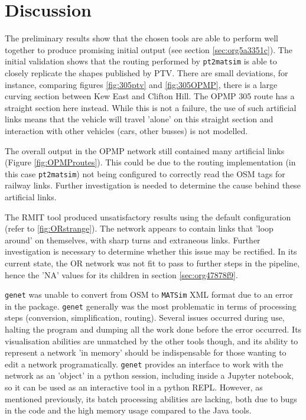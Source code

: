 \documentclass[11pt]{article}
\begin{document}
\section{Discussion}
\label{sec:org4e742d8}
The preliminary results show that the chosen tools are able to perform well together to produce promising initial output (see section \ref{sec:org5a3351c}).  The initial validation shows that the routing performed by \texttt{pt2matsim} is able to closely replicate the shapes published by PTV. There are small deviations, for instance, comparing figures \ref{fig:305ptv} and \ref{fig:305OPMP}, there is a large curving section between Kew East and Clifton Hill. The OPMP 305 route has a straight section here instead. While this is not a failure, the use of such artificial links means that the vehicle will travel 'alone' on this straight section and interaction with other vehicles (cars, other busses) is not modelled.

The overall output in the OPMP network still contained many artificial links (Figure \ref{fig:OPMProutes}). This could be due to the routing implementation (in this case \texttt{pt2matsim}) not being configured to correctly read the OSM tags for railway links. Further investigation is needed to determine the cause behind these artificial links.

The RMIT tool produced unsatisfactory results using the default configuration (refer to \ref{fig:ORstrange}). The network appears to contain links that 'loop around' on themselves, with sharp turns and extraneous links. Further investigation is necessary to determine whether this issue may be rectified. In its current state, the OR network was not fit to pass to further steps in the pipeline, hence the 'NA' values for its children in section \ref{sec:org47878f9}.

\texttt{genet} was unable to convert from OSM to \texttt{MATSim} XML format due to an error in the package. \texttt{genet} generally was the most problematic in terms of processing steps (conversion, simplification, routing). Several issues occurred during use, halting the program and dumping all the work done before the error occurred. Its visualisation abilities are unmatched by the other tools though, and its ability to represent a network 'in memory' should be indispensable for those wanting to edit a network programatically. \texttt{genet} provides an interface to work with the network as an 'object' in a python session, including inside a Jupyter notebook, so it can be used as an interactive tool in a python REPL. However, as mentioned previously, its batch processing abilities are lacking, both due to bugs in the code and the high memory usage compared to the Java tools.
\end{document}
